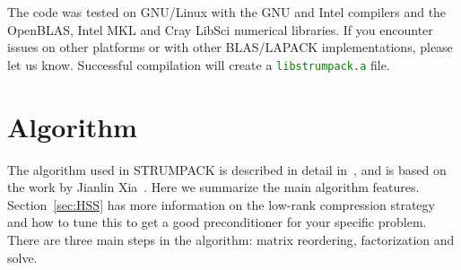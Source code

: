 \documentclass{article}
\newcommand{\tm}{\textsuperscript{\textregistered}}
\begin{document}
The code was tested on GNU/Linux with the GNU and Intel\tm{} compilers
and the OpenBLAS, Intel\tm{} MKL\tm{} and Cray\tm{} LibSci\tm{}
numerical libraries. If you encounter issues on other platforms or
with other BLAS/LAPACK implementations, please let us know.
Successful compilation will create a
\textcolor{green}{\texttt{libstrumpack.a}} file.


\section{Algorithm}\label{sec:algo}
The algorithm used in STRUMPACK is described in detail
in~\cite{ghysels2015sparse}, and is based on the work by Jianlin
Xia~\cite{xia2013randomized}. Here we summarize the main algorithm
features. Section~\ref{sec:HSS} has more information on the low-rank
compression strategy and how to tune this to get a good preconditioner
for your specific problem. There are three main steps in the
algorithm: matrix reordering, factorization and solve.
\end{document}
